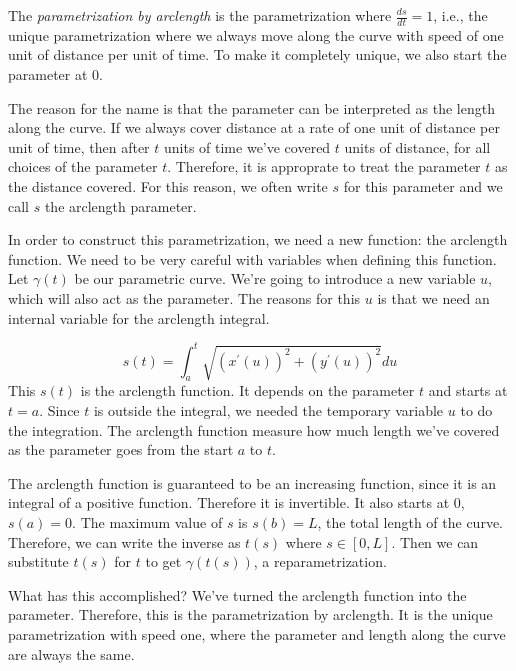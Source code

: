 \documentclass[fleqn]{report}
\begin{document}
\begin{defn} 
The \emph{parametrization by arclength} is the parametrization
where $\frac{ds}{dt} = 1$, i.e., the unique parametrization
where we always move along the curve with speed of one unit of
distance per unit of time. To make it completely unique, we
also start the parameter at 0.
\end{defn}

The reason for the name is that the parameter can be
interpreted as the length along the curve. If we always cover
distance at a rate of one unit of distance per unit of time,
then after $t$ units of time we've covered $t$ units of
distance, for all choices of the parameter $t$. Therefore, it
is approprate to treat the parameter $t$ as the distance
covered. For this reason, we often write $s$ for this
parameter and we call $s$ the arclength parameter.

In order to construct this parametrization, we need a new
function: the arclength function. We need to be very careful
with variables when defining this function. Let $\gamma(t)$ be
our parametric curve. We're going to introduce a new variable
$u$, which will also act as the parameter. The reasons for
this $u$ is that we need an internal variable for the
arclength integral.

\begin{defn} 
\begin{equation*}
s(t) = \int_a^t \sqrt{(x^\prime(u))^2 + (y^\prime(u))^2} du 
\end{equation*}
This $s(t)$ is the arclength function. It depends on the parameter
$t$ and starts at $t=a$. Since $t$ is outside the integral,
we needed the temporary variable $u$ to do the integration.
The arclength function measure how much length we've covered
as the parameter goes from the start $a$ to $t$. 
\end{defn}

The arclength function is guaranteed to be an increasing
function, since it is an integral of a positive function.
Therefore it is invertible. It also starts at 0, $s(a) = 0$.
The maximum value of $s$ is $s(b) = L$, the total length of
the curve. Therefore, we can write the inverse as $t(s)$
where $s \in [0, L]$. Then we can substitute $t(s)$ for $t$
to get $\gamma(t(s))$, a reparametrization.

What has this accomplished? We've turned the arclength
function into the parameter. Therefore, this is the
parametrization by arclength. It is the unique parametrization
with speed one, where the parameter and length along the curve
are always the same. 
\end{document}
